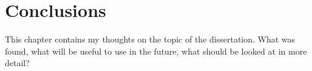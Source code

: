 \documentclass[12pt,]{book}
\theoremstyle{definition}
\theoremstyle{definition}
\theoremstyle{definition}
\theoremstyle{remark}
\begin{document}
\doublespacing

\chapter{Conclusions}\label{ch5}

This chapter contains my thoughts on the topic of the dissertation. What
was found, what will be useful to use in the future, what should be
looked at in more detail?

\setlength{\parskip}{6pt plus 2pt minus 1pt}


\end{document}
